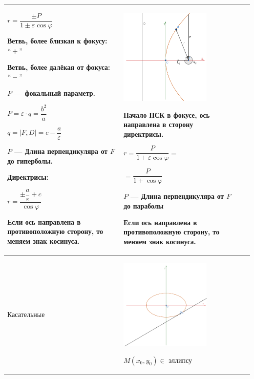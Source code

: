 \documentclass[twoside]{book}
\begin{document}
\begin{center}
\begin{longtable}{|p{2.5cm}|p{4.5cm}|p{4.5cm}|p{4.5cm}|}
        \(r = \dfrac{\pm P}{1 \pm \varepsilon \cos\varphi}\)

        Ветвь, более близкая к фокусу: \(``+"\)

        Ветвь, более далёкая от фокуса: \(``-"\)

        \(P\) --- фокальный параметр.

        \(P = \varepsilon \cdot q = \dfrac{b^2}{a}\)

        \(q = |F, D| = c - \dfrac{a}{\varepsilon}\)

        \(P\) --- Длина перпендикуляра от \(F\) до гиперболы.

        Директрисы:

        \(r = \dfrac{\pm \dfrac{a}{\varepsilon} + c}{\cos\varphi}\)

        Если ось направлена в противоположную сторону, то меняем знак косинуса.
         &
        \begin{center}
            \includegraphics[width=4.5cm]{Images/Chapter_1/3-1-12.png}
        \end{center}
        Начало ПСК в фокусе, ось направлена в сторону директрисы.

        \(r = \dfrac{P}{1 + \varepsilon \cos\varphi} = \)

        \(= \dfrac{P}{1 + \cos\varphi}\)

        \(P\) --- Длина перпендикуляра от \(F\) до параболы

        Если ось направлена в противоположную сторону, то меняем знак косинуса.
        \\
        \hline
        Касательные
         &
        \begin{center}
            \includegraphics[width=4.5cm]{Images/Chapter_1/3-1-13.png}
        \end{center}
        \(M(x_0, y_0) \in\) эллипсу


\end{longtable}
\end{center}
\end{document}
